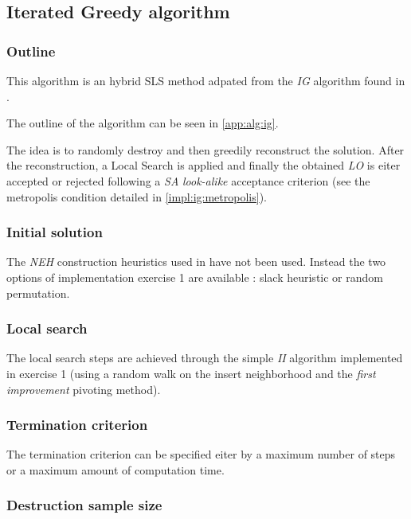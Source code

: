 \subsection{Iterated Greedy algorithm}
\label{impl:ig}

\subsubsection{Outline}

This algorithm is an hybrid SLS method adpated from the \emph{IG} algorithm found in \cite{DBLP:journals/eor/RuizS08}.

The outline of the algorithm can be seen in \ref{app:alg:ig}.

The idea is to randomly destroy and then greedily reconstruct the solution.
After the reconstruction, a Local Search is applied and finally the obtained \emph{LO} is eiter accepted or rejected following a \emph{SA} \emph{look-alike} acceptance criterion (see the metropolis condition detailed in \ref{impl:ig:metropolis}).


\subsubsection{Initial solution}

The \emph{NEH} construction heuristics used in \cite{DBLP:journals/eor/RuizS08} have not been used. Instead the two options of implementation exercise 1 are available : slack heuristic or random permutation.


\subsubsection{Local search}

The local search steps are achieved through the simple \emph{II} algorithm implemented in exercise 1 (using a random walk on the insert neighborhood and the \emph{first improvement} pivoting method).


\subsubsection{Termination criterion}

The termination criterion can be specified eiter by a maximum number of steps or a maximum amount of computation time.

\subsubsection{Destruction sample size}


